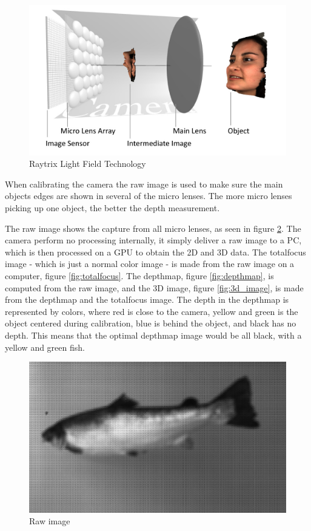 \begin{figure}[h]
    \centering
    \includegraphics[width=.9\linewidth]{images/introduction/Light-Field-Camera-Schematic}
    \caption{Raytrix Light Field Technology}
    \label{fig:light_field}
\end{figure}

When calibrating the camera the raw image is used to make sure the main objects edges are shown in several of the micro lenses. The more micro lenses picking up one object, the better the depth measurement. 

The raw image shows the capture from all micro lenses, as seen in figure \ref{fig:raw_image}. The camera perform no processing internally, it simply deliver a raw image to a PC, which is then processed on a GPU to obtain the 2D and 3D data. 
The totalfocus image - which is just a normal color image - is made from the raw image on a computer, figure \ref{fig:totalfocus}. 
The depthmap, figure \ref{fig:depthmap}, is computed from the raw image, and the 3D image, figure \ref{fig:3d_image}, is made from the depthmap and the totalfocus image. 
The depth in the depthmap is represented by colors, where red is close to the camera, yellow and green is the object centered during calibration, blue is behind the object, and black has no depth. This means that the optimal depthmap image would be all black, with a yellow and green fish.

\begin{figure}[h]
    \centering
    \includegraphics[width=.9\linewidth]{images/introduction/raw}
    \caption{Raw image}
    \label{fig:raw_image}
\end{figure}

